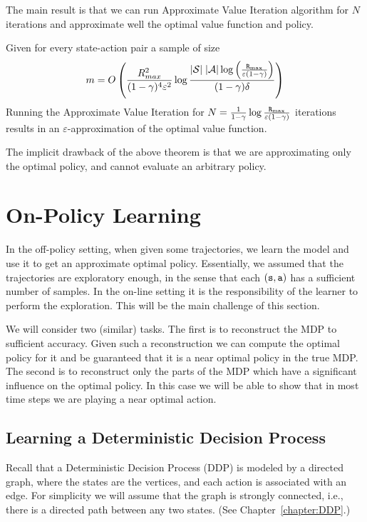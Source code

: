 The main result is that we can run Approximate Value Iteration
algorithm for $N$ iterations and approximate well the optimal value
function and policy.

\begin{theorem}
Given for every state-action pair a sample of size
\[
m=O\left(\frac{R^2_{max}}{(1-\gamma)^4\varepsilon^2}\log \frac{ |\mathcal{S}| \;|\mathcal{A}|\log \left(
\frac{{\tt R}_{\max }}{\varepsilon(1-\gamma)} \right) }{(1-\gamma)\delta}\right)
\]
Running the Approximate Value Iteration for
$N=\frac{1}{1-\gamma}\log \frac{{\tt R}_{\max }}{\varepsilon(1-\gamma)}$
iterations results in an $\varepsilon$-approximation of the optimal value
function.
\end{theorem}

The implicit drawback of the above theorem is that we are
approximating only the optimal policy, and cannot evaluate an
arbitrary policy.

\section{On-Policy Learning}


In the off-policy setting, when given some trajectories, we learn the model and use it to get an approximate optimal
policy. Essentially, we assumed that the trajectories are
exploratory enough, in the sense that each $({\tt s},{\tt a})$ has a
sufficient number of samples.
%
In the on-line setting it is the responsibility of the learner to
perform the exploration. This will be the main challenge of this section.

We will consider two (similar) tasks. The first is to reconstruct
the MDP to sufficient accuracy. Given such a reconstruction we can
compute the optimal policy for it and be guaranteed that it is a
near optimal policy in the true MDP. The second is to reconstruct
only the parts of the MDP which have a significant influence on the
optimal policy. In this case we will be able to show that in most
time steps we are playing a near optimal action.

\subsection{Learning a Deterministic Decision Process}

Recall that a Deterministic Decision Process (DDP) is modeled by a
directed graph, where the states are the vertices, and each action
is associated with an edge. For simplicity we will assume that the
graph is strongly connected, i.e., there is a directed path between
any two states. (See Chapter~\ref{chapter:DDP}.)

